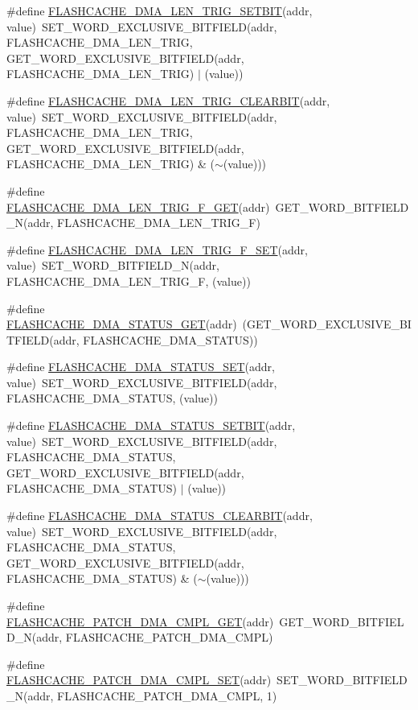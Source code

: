 \begin{DoxyCompactItemize}
\item 
\#define \hyperlink{a00549_a4ca3ed45e49093232d0347c158b4d57f}{FLASHCACHE\_\-DMA\_\-LEN\_\-TRIG\_\-SETBIT}(addr, value)~SET\_\-WORD\_\-EXCLUSIVE\_\-BITFIELD(addr, FLASHCACHE\_\-DMA\_\-LEN\_\-TRIG, GET\_\-WORD\_\-EXCLUSIVE\_\-BITFIELD(addr, FLASHCACHE\_\-DMA\_\-LEN\_\-TRIG) $|$ (value))
\item 
\#define \hyperlink{a00549_a002ebcd5c8950804ce55bae5398fd74c}{FLASHCACHE\_\-DMA\_\-LEN\_\-TRIG\_\-CLEARBIT}(addr, value)~SET\_\-WORD\_\-EXCLUSIVE\_\-BITFIELD(addr, FLASHCACHE\_\-DMA\_\-LEN\_\-TRIG, GET\_\-WORD\_\-EXCLUSIVE\_\-BITFIELD(addr, FLASHCACHE\_\-DMA\_\-LEN\_\-TRIG) \& ($\sim$(value)))
\item 
\#define \hyperlink{a00549_a7b9a21d16f67d2640e4ac3911420b0c3}{FLASHCACHE\_\-DMA\_\-LEN\_\-TRIG\_\-F\_\-GET}(addr)~GET\_\-WORD\_\-BITFIELD\_\-N(addr, FLASHCACHE\_\-DMA\_\-LEN\_\-TRIG\_\-F)
\item 
\#define \hyperlink{a00549_a2bc8c9bfec5542ce6149335128778a88}{FLASHCACHE\_\-DMA\_\-LEN\_\-TRIG\_\-F\_\-SET}(addr, value)~SET\_\-WORD\_\-BITFIELD\_\-N(addr, FLASHCACHE\_\-DMA\_\-LEN\_\-TRIG\_\-F, (value))
\item 
\#define \hyperlink{a00549_a0b3cd7c3dbef2a0f82f6c278e97affad}{FLASHCACHE\_\-DMA\_\-STATUS\_\-GET}(addr)~(GET\_\-WORD\_\-EXCLUSIVE\_\-BITFIELD(addr, FLASHCACHE\_\-DMA\_\-STATUS))
\item 
\#define \hyperlink{a00549_a9a325dac60fe4a417750d713de9a7c80}{FLASHCACHE\_\-DMA\_\-STATUS\_\-SET}(addr, value)~SET\_\-WORD\_\-EXCLUSIVE\_\-BITFIELD(addr, FLASHCACHE\_\-DMA\_\-STATUS, (value))
\item 
\#define \hyperlink{a00549_a5241aaaf60833c826c4ac9124c38e92c}{FLASHCACHE\_\-DMA\_\-STATUS\_\-SETBIT}(addr, value)~SET\_\-WORD\_\-EXCLUSIVE\_\-BITFIELD(addr, FLASHCACHE\_\-DMA\_\-STATUS, GET\_\-WORD\_\-EXCLUSIVE\_\-BITFIELD(addr, FLASHCACHE\_\-DMA\_\-STATUS) $|$ (value))
\item 
\#define \hyperlink{a00549_aba4bb7da93f9948376455d941559404b}{FLASHCACHE\_\-DMA\_\-STATUS\_\-CLEARBIT}(addr, value)~SET\_\-WORD\_\-EXCLUSIVE\_\-BITFIELD(addr, FLASHCACHE\_\-DMA\_\-STATUS, GET\_\-WORD\_\-EXCLUSIVE\_\-BITFIELD(addr, FLASHCACHE\_\-DMA\_\-STATUS) \& ($\sim$(value)))
\item 
\#define \hyperlink{a00549_af9b1add2f22d53ccf4526850648e0652}{FLASHCACHE\_\-PATCH\_\-DMA\_\-CMPL\_\-GET}(addr)~GET\_\-WORD\_\-BITFIELD\_\-N(addr, FLASHCACHE\_\-PATCH\_\-DMA\_\-CMPL)
\item 
\#define \hyperlink{a00549_a8a9ae9791721e9173f6abe87d2f259ef}{FLASHCACHE\_\-PATCH\_\-DMA\_\-CMPL\_\-SET}(addr)~SET\_\-WORD\_\-BITFIELD\_\-N(addr, FLASHCACHE\_\-PATCH\_\-DMA\_\-CMPL, 1)

\end{DoxyCompactItemize}
